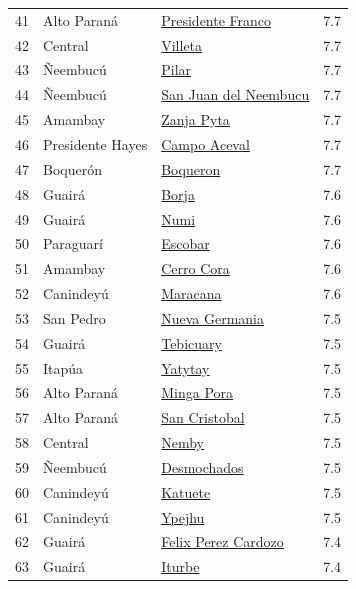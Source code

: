 {\begin{longtable}[]{@{}llll@{}}
41 & Alto Paraná & \hyperref[dist:10_Alto_Parana:Presidente_Franco]{Presidente Franco} & 7.7 \\
42 & Central & \hyperref[dist:11_Central:Villeta]{Villeta} & 7.7 \\
43 & Ñeembucú & \hyperref[dist:12_Neembucu:Pilar]{Pilar} & 7.7 \\
44 & Ñeembucú & \hyperref[dist:12_Neembucu:San_Juan_del_Neembucu]{San Juan del Neembucu} & 7.7 \\
45 & Amambay & \hyperref[dist:13_Amambay:Zanja_Pyta]{Zanja Pyta} & 7.7 \\
46 & Presidente Hayes & \hyperref[dist:15_Presidente_Hayes:Campo_Aceval]{Campo Aceval} & 7.7 \\
47 & Boquerón & \hyperref[dist:16_Boqueron:Boqueron]{Boqueron} & 7.7 \\
48 & Guairá & \hyperref[dist:04_Guaira:Borja]{Borja} & 7.6 \\
49 & Guairá & \hyperref[dist:04_Guaira:Numi]{Numi} & 7.6 \\
50 & Paraguarí & \hyperref[dist:09_Paraguari:Escobar]{Escobar} & 7.6 \\
51 & Amambay & \hyperref[dist:13_Amambay:Cerro_Cora]{Cerro Cora} & 7.6 \\
52 & Canindeyú & \hyperref[dist:14_Canindeyu:Maracana]{Maracana} & 7.6 \\
53 & San Pedro & \hyperref[dist:02_San_Pedro:Nueva_Germania]{Nueva Germania} & 7.5 \\
54 & Guairá & \hyperref[dist:04_Guaira:Tebicuary]{Tebicuary} & 7.5 \\
55 & Itapúa & \hyperref[dist:07_Itapua:Yatytay]{Yatytay} & 7.5 \\
56 & Alto Paraná & \hyperref[dist:10_Alto_Parana:Minga_Pora]{Minga Pora} & 7.5 \\
57 & Alto Paraná & \hyperref[dist:10_Alto_Parana:San_Cristobal]{San Cristobal} & 7.5 \\
58 & Central & \hyperref[dist:11_Central:Nemby]{Nemby} & 7.5 \\
59 & Ñeembucú & \hyperref[dist:12_Neembucu:Desmochados]{Desmochados} & 7.5 \\
60 & Canindeyú & \hyperref[dist:14_Canindeyu:Katuete]{Katuete} & 7.5 \\
61 & Canindeyú & \hyperref[dist:14_Canindeyu:Ypejhu]{Ypejhu} & 7.5 \\
62 & Guairá & \hyperref[dist:04_Guaira:Felix_Perez_Cardozo]{Felix Perez Cardozo} & 7.4 \\
63 & Guairá & \hyperref[dist:04_Guaira:Iturbe]{Iturbe} & 7.4 \\

\end{longtable}}
